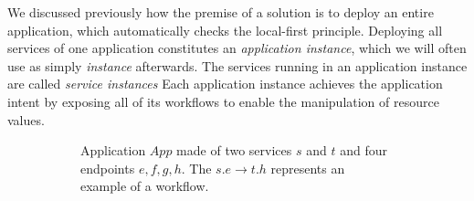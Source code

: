 %
We discussed previously how the premise of a solution is to deploy an
entire application, which automatically checks the local-first
principle.
%
Deploying all services of one application constitutes an
\emph{application instance}, which we will often use as simply
\emph{instance} afterwards.
%
The services running in an application instance are called \emph{service
instances}
%
Each application instance achieves the application intent by exposing
all of its workflows to enable the manipulation of resource values.

\vspace{5pt}

\begin{figure}[htbp]
  \centering
  \begin{subfigure}[b]{.7\textwidth}
    \centering
    \caption{Application $App$ made of two services $s$ and $t$ and
      four endpoints $e, f, g, h$. The $s.e \rightarrow t.h$
      represents an example of a workflow.}
    \label{fig:application}
  \end{subfigure}%
  \vspace{12pt}
  \begin{subfigure}[b]{.7\textwidth}
    \centering
\end{subfigure}
\end{figure}
